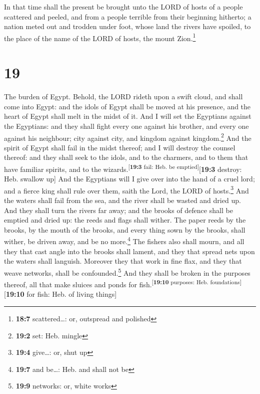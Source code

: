  In that time shall the present be brought unto the LORD
of hosts of a people scattered and peeled, and from a people terrible
from their beginning hitherto; a nation meted out and trodden under
foot, whose land the rivers have spoiled, to the place of the name of
the LORD of hosts, the mount Zion.\footnote{\textbf{18:7}
  scattered\ldots: or, outspread and polished}

\hypertarget{section-18}{%
\section{19}\label{section-18}}

 The burden of Egypt. Behold, the LORD rideth upon a swift
cloud, and shall come into Egypt: and the idols of Egypt shall be moved
at his presence, and the heart of Egypt shall melt in the midst of it.
 And I will set the Egyptians against the Egyptians: and
they shall fight every one against his brother, and every one against
his neighbour; city against city, and kingdom against
kingdom.\footnote{\textbf{19:2} set: Heb. mingle}  And the
spirit of Egypt shall fail in the midst thereof; and I will destroy the
counsel thereof: and they shall seek to the idols, and to the charmers,
and to them that have familiar spirits, and to the
wizards.\textsuperscript{{[}\textbf{19:3} fail: Heb. be
emptied{]}}{[}\textbf{19:3} destroy: Heb. swallow up{]} 
And the Egyptians will I give over into the hand of a cruel lord; and a
fierce king shall rule over them, saith the Lord, the LORD of
hosts.\footnote{\textbf{19:4} give\ldots: or, shut up} 
And the waters shall fail from the sea, and the river shall be wasted
and dried up.  And they shall turn the rivers far away;
and the brooks of defence shall be emptied and dried up: the reeds and
flags shall wither.  The paper reeds by the brooks, by the
mouth of the brooks, and every thing sown by the brooks, shall wither,
be driven away, and be no more.\footnote{\textbf{19:7} and be\ldots:
  Heb. and shall not be}  The fishers also shall mourn,
and all they that cast angle into the brooks shall lament, and they that
spread nets upon the waters shall languish.  Moreover they
that work in fine flax, and they that weave networks, shall be
confounded.\footnote{\textbf{19:9} networks: or, white works}
 And they shall be broken in the purposes thereof, all
that make sluices and ponds for fish.\textsuperscript{{[}\textbf{19:10}
purposes: Heb. foundations{]}}{[}\textbf{19:10} for fish: Heb. of living
things{]}

